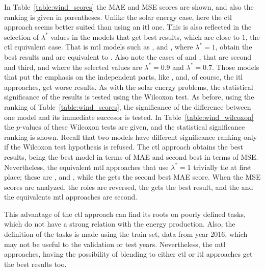 In Table~\ref{table:wind_scores} the MAE and MSE scores are shown, and also the ranking is given in parentheses. 
Unlike the solar energy case, here the \acrshort{ctl} approach seems better suited than using an \acrshort{itl} one. This is also reflected in the selection of $\lambda^*$ values in the models that get best results, which are close to $1$, the \acrshort{ctl} equivalent case. That is \acrshort{mtl} models such as ,  and , where $\lambda^*=1$, obtain the best results and are equivalent to . Also note the cases of  and , that are second and third, and where the selected values are $\lambda^*=0.9$ and $\lambda^*=0.7$.
Those models that put the emphasis on the independent parts, like , and, of course, the \acrshort{itl} approaches, get worse results.
%
%
As with the solar energy problems, the statistical significance of the results is tested using the Wilcoxon test. As before, using the ranking of Table~\ref{table:wind_scores}, the significance of the difference between one model and its immediate succesor is tested. 
%
In Table~\ref{table:wind_wilcoxon} the $p$-values of these Wilcoxon tests are given, and the statistical significance ranking is shown. Recall that two models have different significance ranking only if the Wilcoxon test hypothesis is refused.
%
The \acrshort{ctl} approach obtains the best results, being the best model in terms of MAE and second best in terms of MSE. Nevertheless, the equivalent \acrshort{mtl} approaches that use $\lambda^*=1$ trivially tie at first place; these are ,  and , while the  gets the second best MAE score.
When the MSE scores are analyzed, the roles are reversed, the  gets the best result, and the  and the equivalents \acrshort{mtl} approaches are second.

%
This advantage of the \acrshort{ctl} approach can find its roots on poorly defined tasks, which do not have a strong relation with the energy production. Also, the definition of the tasks is made using the train set, data from year 2016, which may not be useful to the validation or test years.
Nevertheless, the \acrshort{mtl} approaches, having the possibility of blending to either \acrshort{ctl} or \acrshort{itl} approaches get the best results too.

